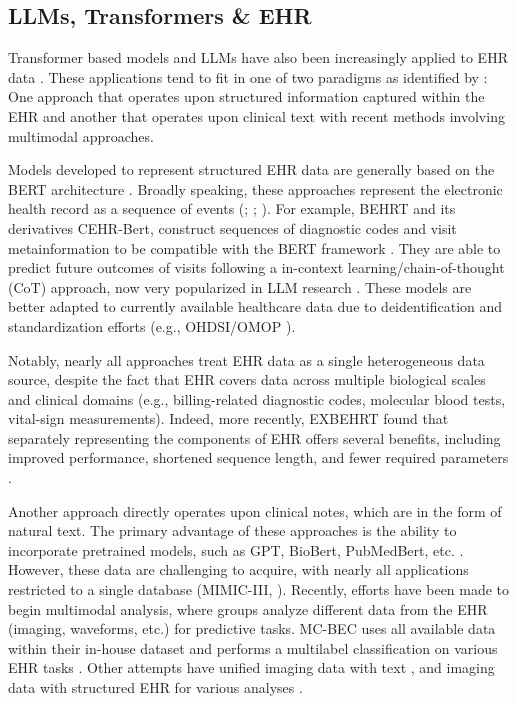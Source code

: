 \documentclass{article}
\theoremstyle{plain}
\theoremstyle{definition}
\theoremstyle{remark}
\begin{document}
\subsection{LLMs, Transformers \& EHR}
Transformer based models and LLMs have also been increasingly applied to EHR data \citep{kalyan_ammu_2022}. These applications tend to fit in one of two paradigms as identified by \citep{wornow_shaky_2023}: One approach that operates upon structured information captured within the EHR and another that operates upon clinical text with recent methods involving multimodal approaches. 

Models developed to represent structured EHR data are generally based on the BERT architecture \citep{kalyan_ammu_2022}. Broadly speaking, these approaches represent the electronic health record as a sequence of events (\cite{wornow2024ehrshot}; \cite{hur2023genhpf}; \cite{hur2022unifying}). For example, BEHRT and its derivatives CEHR-Bert, construct sequences of diagnostic codes and visit metainformation to be compatible with the BERT framework \citep{li_behrt_2020, li_hi-behrt_2021, rasmy_med-bert_2021, pang_cehr-bert_nodate}. They are able to predict future outcomes of visits following a in-context learning/chain-of-thought (CoT) approach, now very popularized in LLM research \citep{wei2022chain}. These models are better adapted to currently available healthcare data due to deidentification and standardization efforts (e.g., OHDSI/OMOP \citep{noauthor_omop_nodate}). 

Notably, nearly all approaches treat EHR data as a single heterogeneous data source, despite the fact that EHR covers data across multiple biological scales and clinical domains (e.g., billing-related diagnostic codes, molecular blood tests, vital-sign measurements). Indeed, more recently, EXBEHRT found that separately representing the components of EHR offers several benefits, including improved performance, shortened sequence length, and fewer required parameters \citep{rupp_exbehrt_2023}.

Another approach directly operates upon clinical notes, which are in the form of natural text. The primary advantage of these approaches is the ability to incorporate pretrained models, such as GPT, BioBert, PubMedBert, etc. \citep{roy-pan-2021-incorporating, chief-bert}. However, these data are challenging to acquire, with nearly all applications restricted to a single database (MIMIC-III, \citep{johnson_mimic-iii_2016}). Recently, efforts have been made to begin multimodal analysis, where groups analyze different data from the EHR (imaging, waveforms, etc.) for predictive tasks. MC-BEC uses all available data within their in-house dataset and performs a multilabel classification on various EHR tasks \citep{chen2023multimodal}. Other attempts have unified imaging data with text \citep{khader2023medical}, and imaging data with structured EHR for various analyses \citep{zhou2023transformer}.
\end{document}
